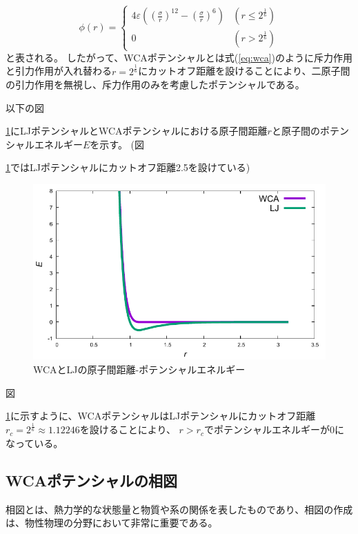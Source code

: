 \documentclass[titlepage]{jsreport}
\begin{document}
\large
\begin{equation}
\phi(r) = \left\{ \begin{array}{ll}
    4{\varepsilon}\left(\left(\frac{\sigma}{r}\right)^{12}-\left(\frac{\sigma}{r}\right)^6\right) & (r\leq2^{\frac{1}{6}}) \\
    0 & (r>2^{\frac{1}{6}})\label{eq:wca}
\end{array} \right.
\end{equation}
\normalsize
と表される\cite{doi:10.1063/1.2176675}。
したがって、WCAポテンシャルとは式(\ref{eq:wca})のように斥力作用と引力作用が入れ替わる$r=2^{\frac{1}{6}}$にカットオフ距離を設けることにより、二原子間の引力作用を無視し、斥力作用のみを考慮したポテンシャルである。

以下の図{\ref{fig:dis-poen}にLJポテンシャルとWCAポテンシャルにおける原子間距離$r$と原子間のポテンシャルエネルギー$E$を示す。
(図{\ref{fig:dis-poen}ではLJポテンシャルにカットオフ距離2.5を設けている)

\begin{figure}[htbp]
    \begin{center}
        \includegraphics[width=13cm]{fig/dis-poen.pdf}
    \end{center}
    \caption{WCAとLJの原子間距離-ポテンシャルエネルギー}
    \label{fig:dis-poen}
\end{figure}
図{\ref{fig:dis-poen}に示すように、WCAポテンシャルはLJポテンシャルにカットオフ距離$r_c=2^{\frac{1}{6}}{\approx}1.12246$を設けることにより、
$r>r_c$でポテンシャルエネルギーが0になっている。


\newpage
\subsection{WCAポテンシャルの相図}\label{method-subsec:WCA-phase}
相図とは、熱力学的な状態量と物質や系の関係を表したものであり、相図の作成は、物性物理の分野において非常に重要である\cite{gaussian-phase}。

}}}
\end{document}
